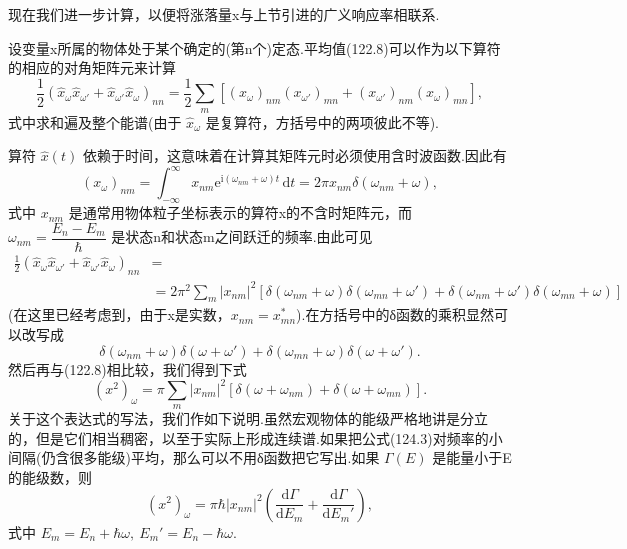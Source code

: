现在我们进一步计算，以便将涨落量x与上节引进的广义响应率相联系.

设变量x所属的物体处于某个确定的(第n个)定态.平均值(122.8)可以作为以下算符的相应的对角矩阵元来计算
\begin{equation}
  \frac{1}{2}\left(\hat{x}_\omega\hat{x}_{\omega'}
  +\hat{x}_{\omega'}\hat{x}_\omega\right)_{nn}
  =\frac{1}{2}\sum_m\left[(x_\omega)_{nm}(x_{\omega'})_{mn}
  +(x_{\omega'})_{nm}(x_\omega)_{mn}\right],
\end{equation}
式中求和遍及整个能谱(由于 $\hat{x}_\omega$ 是复算符，方括号中的两项彼此不等).

算符 $\hat{x}(t)$ 依赖于时间，这意味着在计算其矩阵元时必须使用含时波函数.因此有
\begin{equation}
  (x_\omega)_{nm}=\int_{-\infty}^{\infty}x_{nm}
  \mathrm{e}^{\mathrm{i}(\omega_{nm}+\omega)t}\,\mathrm{d}t
  =2\pi x_{nm}\delta(\omega_{nm}+\omega),
\end{equation}
式中 $x_{nm}$ 是通常用物体粒子坐标表示的算符x的不含时矩阵元，而
$\omega_{nm}=\dfrac{E_n-E_m}{\hbar}$ 是状态n和状态m之间跃迁的频率.由此可见
\begin{equation*}
\begin{aligned}
  \frac{1}{2}\left(\hat{x}_\omega\hat{x}_{\omega'}
  +\hat{x}_{\omega'}\hat{x}_\omega\right)_{nn}&=\\
  &=2\pi^2\sum_m|x_{nm}|^2\left[\delta(\omega_{nm}+\omega)\delta(\omega_{mn}+\omega')
  +\delta(\omega_{nm}+\omega')\delta(\omega_{mn}+\omega)\right]
\end{aligned}
\end{equation*}
(在这里已经考虑到，由于x是实数，$x_{nm}=x_{mn}^*$).在方括号中的δ函数的乘积显然可以改写成
\begin{equation*}
  \delta(\omega_{nm}+\omega)\delta(\omega+\omega')
  +\delta(\omega_{mn}+\omega)\delta(\omega+\omega').
\end{equation*}
然后再与(122.8)相比较，我们得到下式
\begin{equation}
  (x^2)_\omega=\pi\sum_m|x_{nm}|^2\left[\delta(\omega+\omega_{nm})
  +\delta(\omega+\omega_{mn})\right].
\end{equation}
关于这个表达式的写法，我们作如下说明.虽然宏观物体的能级严格地讲是分立的，但是它们相当稠密，以至于实际上形成连续谱.如果把公式(124.3)对频率的小间隔(仍含很多能级)平均，那么可以不用δ函数把它写出.如果 $\Gamma(E)$ 是能量小于E的能级数，则
\begin{equation}
  (x^2)_\omega=\pi\hbar|x_{nm}|^2\left(\frac{\mathrm{d}\Gamma}{\mathrm{d}E_m}
  +\frac{\mathrm{d}\Gamma}{\mathrm{d}E_m'}\right),
\end{equation}
式中 $E_m=E_n+\hbar\omega,\ E_m'=E_n-\hbar\omega$.

